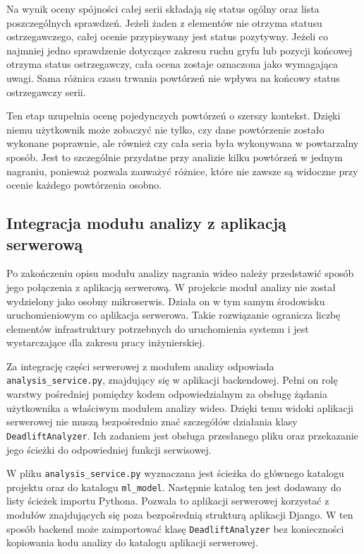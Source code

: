 Na wynik oceny spójności całej serii składają się status ogólny oraz lista poszczególnych sprawdzeń. Jeżeli żaden z elementów nie otrzyma statusu ostrzegawczego, całej ocenie przypisywany jest status pozytywny. Jeżeli co najmniej jedno sprawdzenie dotyczące zakresu ruchu gryfu lub pozycji końcowej otrzyma status ostrzegawczy, cała ocena zostaje oznaczona jako wymagająca uwagi. Sama różnica czasu trwania powtórzeń nie wpływa na końcowy status ostrzegawczy serii.

Ten etap uzupełnia ocenę pojedynczych powtórzeń o szerszy kontekst. Dzięki niemu użytkownik może zobaczyć nie tylko, czy dane powtórzenie zostało wykonane poprawnie, ale również czy cała seria była wykonywana w powtarzalny sposób. Jest to szczególnie przydatne przy analizie kilku powtórzeń w jednym nagraniu, ponieważ pozwala zauważyć różnice, które nie zawsze są widoczne przy ocenie każdego powtórzenia osobno.

\subsection{Integracja modułu analizy z aplikacją serwerową}

Po zakończeniu opisu modułu analizy nagrania wideo należy przedstawić sposób jego połączenia z aplikacją serwerową. W projekcie moduł analizy nie został wydzielony jako osobny mikroserwis. Działa on w tym samym środowisku uruchomieniowym co aplikacja serwerowa. Takie rozwiązanie ogranicza liczbę elementów infrastruktury potrzebnych do uruchomienia systemu i jest wystarczające dla zakresu pracy inżynierskiej.

Za integrację części serwerowej z modułem analizy odpowiada \texttt{analysis\_service.py}, znajdujący się w aplikacji backendowej. Pełni on rolę warstwy pośredniej pomiędzy kodem odpowiedzialnym za obsługę żądania użytkownika a właściwym modułem analizy wideo. Dzięki temu widoki aplikacji serwerowej nie muszą bezpośrednio znać szczegółów działania klasy \texttt{DeadliftAnalyzer}. Ich zadaniem jest obsługa przesłanego pliku oraz przekazanie jego ścieżki do odpowiedniej funkcji serwisowej.

W pliku \texttt{analysis\_service.py} wyznaczana jest ścieżka do głównego katalogu projektu oraz do katalogu \texttt{ml\_model}. Następnie katalog ten jest dodawany do listy ścieżek importu Pythona. Pozwala to aplikacji serwerowej korzystać z modułów znajdujących się poza bezpośrednią strukturą aplikacji Django. W ten sposób backend może zaimportować klasę \texttt{DeadliftAnalyzer} bez konieczności kopiowania kodu analizy do katalogu aplikacji serwerowej.

